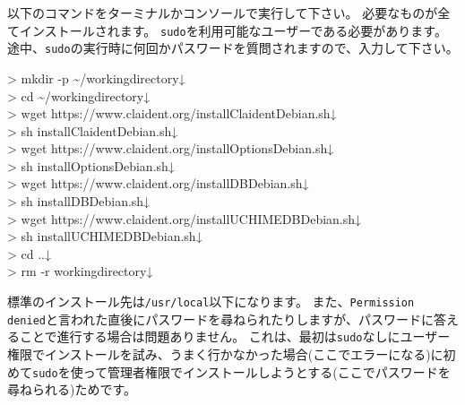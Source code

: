 \documentclass[titlepage,10pt,a4paper]{jsbook}
\newenvironment{cmd}{\begin{oframed}\raggedright\ttfamily\footnotesize\setlength{\baselineskip}{1.4em}}{\end{oframed}\vspace{-1em}}
\begin{document}
以下のコマンドをターミナルかコンソールで実行して下さい。
必要なものが全てインストールされます。
\texttt{sudo}を利用可能なユーザーである必要があります。
途中、\texttt{sudo}の実行時に何回かパスワードを質問されますので、入力して下さい。
\begin{cmd}
{\textgreater} mkdir -p {\textasciitilde}/workingdirectory↓\\
{\textgreater} cd {\textasciitilde}/workingdirectory↓\\
{\textgreater} wget https://www.claident.org/installClaident{\textunderscore}Debian.sh↓\\
{\textgreater} sh installClaident{\textunderscore}Debian.sh↓\\
{\textgreater} wget https://www.claident.org/installOptions{\textunderscore}Debian.sh↓\\
{\textgreater} sh installOptions{\textunderscore}Debian.sh↓\\
{\textgreater} wget https://www.claident.org/installDB{\textunderscore}Debian.sh↓\\
{\textgreater} sh installDB{\textunderscore}Debian.sh↓\\
{\textgreater} wget https://www.claident.org/installUCHIMEDB{\textunderscore}Debian.sh↓\\
{\textgreater} sh installUCHIMEDB{\textunderscore}Debian.sh↓\\
{\textgreater} cd ..↓\\
{\textgreater} rm -r workingdirectory↓
\end{cmd}
標準のインストール先は\texttt{/usr/local}以下になります。
また、\texttt{Permission denied}と言われた直後にパスワードを尋ねられたりしますが、パスワードに答えることで進行する場合は問題ありません。
これは、最初は\texttt{sudo}なしにユーザー権限でインストールを試み、うまく行かなかった場合(ここでエラーになる)に初めて\texttt{sudo}を使って管理者権限でインストールしようとする(ここでパスワードを尋ねられる)ためです。
\end{document}
